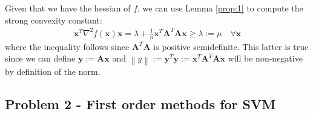 \documentclass[letterpaper]{article}
\providecommand{\xx}{\mathbf{x}}
\providecommand{\yy}{\mathbf{y}}
\providecommand{\1}{\mathbf{1}}
\providecommand{\0}{\mathbf{0}}
\providecommand{\mA}{\mathbf{A}}
\providecommand{\norm}[1]{\ensuremath{\left\lVert#1\right\rVert}}
\begin{document}
\begin{enumerate}[label=(\alph*)]
    Given that we have the hessian of $f$, we can use Lemma \ref{prop:1} to compute the strong convexity constant:
    \begin{align}
        \xx^T \nabla^2 f(\xx) \xx  = \lambda + \frac{1}{n}\xx^T\mA^T \mA \xx \geq \lambda := \mu \quad \forall \xx
    \end{align}
    where the inequality follows since $\mA^T \mA$ is positive semidefinite. This latter is true since we can define $\yy:=\mA \xx$ and $\norm{y} := \yy^T \yy := \xx^T\mA^T \mA \xx $ will be non-negative by definition of the norm.
\end{enumerate}

\subsection*{Problem 2 - First order methods for SVM}
\end{document}
